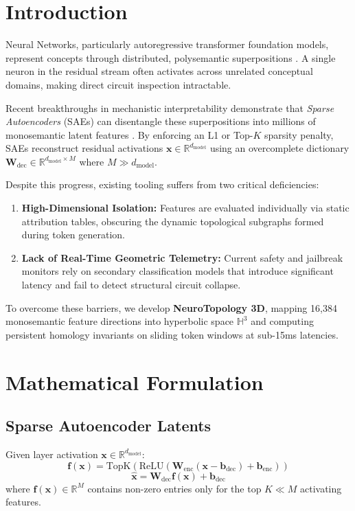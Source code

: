 \documentclass[10pt,journal,compsoc]{IEEEtran}
\begin{document}
\section{Introduction}
 Neural Networks, particularly autoregressive transformer foundation models, represent concepts through distributed, polysemantic superpositions \cite{olah2020zoom}. A single neuron in the residual stream often activates across unrelated conceptual domains, making direct circuit inspection intractable.

Recent breakthroughs in mechanistic interpretability demonstrate that \textit{Sparse Autoencoders} (SAEs) can disentangle these superpositions into millions of monosemantic latent features \cite{cunningham2023sparse, bricken2023towards}. By enforcing an L1 or Top-$K$ sparsity penalty, SAEs reconstruct residual activations $\mathbf{x} \in \mathbb{R}^{d_{\text{model}}}$ using an overcomplete dictionary $\mathbf{W}_{\text{dec}} \in \mathbb{R}^{d_{\text{model}} \times M}$ where $M \gg d_{\text{model}}$.

Despite this progress, existing tooling suffers from two critical deficiencies:
\begin{enumerate}
    \item \textbf{High-Dimensional Isolation:} Features are evaluated individually via static attribution tables, obscuring the dynamic topological subgraphs formed during token generation.
    \item \textbf{Lack of Real-Time Geometric Telemetry:} Current safety and jailbreak monitors rely on secondary classification models that introduce significant latency and fail to detect structural circuit collapse.
\end{enumerate}

To overcome these barriers, we develop \textbf{NeuroTopology 3D}, mapping 16,384 monosemantic feature directions into hyperbolic space $\mathbb{H}^3$ and computing persistent homology invariants on sliding token windows at sub-15ms latencies.

\section{Mathematical Formulation}

\subsection{Sparse Autoencoder Latents}
Given layer activation $\mathbf{x} \in \mathbb{R}^{d_{\text{model}}}$:
\begin{equation}
    \mathbf{f}(\mathbf{x}) = \text{TopK}\left(\text{ReLU}\left(\mathbf{W}_{\text{enc}}(\mathbf{x} - \mathbf{b}_{\text{dec}}) + \mathbf{b}_{\text{enc}}\right)\right)
\end{equation}
\begin{equation}
    \mathbf{\hat{x}} = \mathbf{W}_{\text{dec}}\mathbf{f}(\mathbf{x}) + \mathbf{b}_{\text{dec}}
\end{equation}
where $\mathbf{f}(\mathbf{x}) \in \mathbb{R}^M$ contains non-zero entries only for the top $K \ll M$ activating features.
\end{document}
